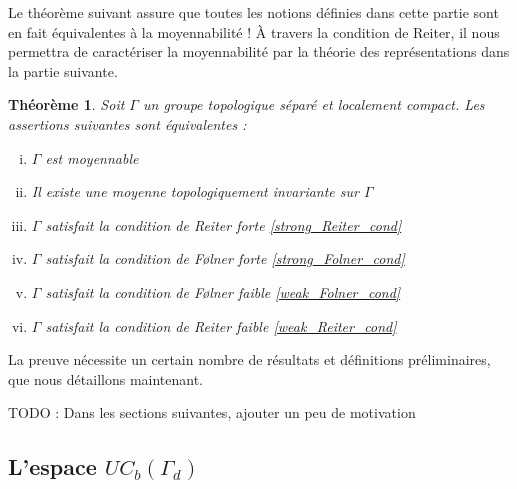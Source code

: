 \documentclass[a4paper,12pt]{article}
\newtheorem{theorem}{Théorème}[section]
\newcommand{\TODO}[1]{{\color{red}TODO :} #1}
\begin{document}
Le théorème suivant assure que toutes les notions définies dans cette partie sont en fait équivalentes à la moyennabilité ! À travers la condition de Reiter, il nous 
permettra de caractériser la moyennabilité par la théorie des représentations dans la partie suivante.

\begin{theorem}\label{amenable_TFAE}
    Soit $\Gamma$ un groupe topologique séparé et localement compact. Les assertions suivantes sont équivalentes :
    \begin{enumerate}[(i)]
        \item $\Gamma$ est moyennable \label{amenable_TFAE/amenable}
        \item Il existe une moyenne topologiquement invariante sur $\Gamma$ \label{amenable_TFAE/topological_mean}
        \item $\Gamma$ satisfait la condition de Reiter forte \label{amenable_TFAE/strong_Reiter} \eqref{strong_Reiter_cond}
        \item $\Gamma$ satisfait la condition de F\o{}lner forte \label{amenable_TFAE/strong_Folner} \eqref{strong_Folner_cond}
        \item $\Gamma$ satisfait la condition de F\o{}lner faible \label{amenable_TFAE/weak_Folner} \eqref{weak_Folner_cond}
        \item $\Gamma$ satisfait la condition de Reiter faible \label{amenable_TFAE/weak_Reiter} \eqref{weak_Reiter_cond}
    \end{enumerate}
\end{theorem}

La preuve nécessite un certain nombre de résultats et définitions préliminaires, que nous détaillons maintenant. 

\TODO{Dans les sections suivantes, ajouter un peu de motivation}

\subsection{L'espace \texorpdfstring{$UC_b(\Gamma_d)$}{des fonctions uniformément continues bornées}}
\end{document}
